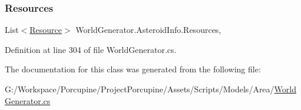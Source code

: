 \subsubsection{\texorpdfstring{Resources}{Resources}}
{\footnotesize\ttfamily List$<$\hyperlink{class_world_generator_1_1_resource}{Resource}$>$ World\+Generator.\+Asteroid\+Info.\+Resources\hspace{0.3cm}{\ttfamily [get]}, {\ttfamily [set]}}



Definition at line 304 of file World\+Generator.\+cs.



The documentation for this class was generated from the following file\+:\begin{DoxyCompactItemize}
\item 
G\+:/\+Workspace/\+Porcupine/\+Project\+Porcupine/\+Assets/\+Scripts/\+Models/\+Area/\hyperlink{_world_generator_8cs}{World\+Generator.\+cs}\end{DoxyCompactItemize}
